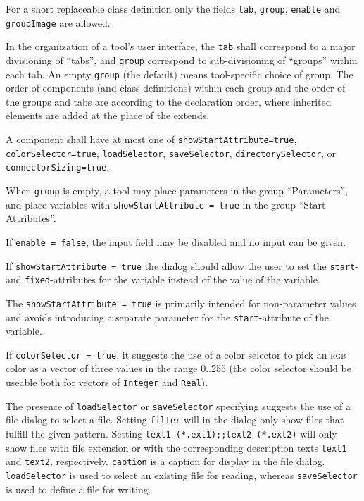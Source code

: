 For a short replaceable class definition only the fields \lstinline!tab!, \lstinline!group!, \lstinline!enable! and \lstinline!groupImage! are allowed.

In the organization of a tool's user interface, the \lstinline!tab! shall correspond to a major divisioning of ``tabs'', and \lstinline!group! correspond to sub-divisioning of ``groups'' within each tab.
An empty \lstinline!group! (the default) means tool-specific choice of group.
The order of components (and class definitions) within each group and the order of the groups and tabs are according to the declaration order, where inherited elements are added at the place of the extends.

A component shall have at most one of \lstinline!showStartAttribute=true!, \lstinline!colorSelector=true!, \lstinline!loadSelector!, \lstinline!saveSelector!, \lstinline!directorySelector!, or \lstinline!connectorSizing=true!.

\begin{example}
When \lstinline!group! is empty, a tool may place parameters in the group ``Parameters'', and place variables with \lstinline!showStartAttribute = true! in the group ``Start Attributes''.
\end{example}

If \lstinline!enable = false!, the input field may be disabled and no input can be given.

If \lstinline!showStartAttribute = true! the dialog should allow the user to set the \lstinline!start!- and \lstinline!fixed!-attributes for the variable instead of the value of the variable.

\begin{nonnormative}
The \lstinline!showStartAttribute = true! is primarily intended for non-parameter values and avoids introducing a separate parameter for the \lstinline!start!-attribute of the variable.
\end{nonnormative}

If \lstinline!colorSelector = true!, it suggests the use of a color selector to pick an \textsc{rgb} color as a vector of three values in the range 0..255 (the color selector should be useable both for vectors of \lstinline!Integer! and \lstinline!Real!).

The presence of \lstinline!loadSelector! or \lstinline!saveSelector! specifying  suggests the use of a file dialog to select a file.
Setting \lstinline!filter! will in the dialog only show files that fulfill the given pattern.
Setting \lstinline!text1 (*.ext1);;text2 (*.ext2)! will only show files with file extension  or  with the corresponding description texts \lstinline!text1! and \lstinline!text2!, respectively.
\lstinline!caption! is a caption for display in the file dialog.
\lstinline!loadSelector! is used to select an existing file for reading, whereas \lstinline!saveSelector! is used to define a file for writing.

